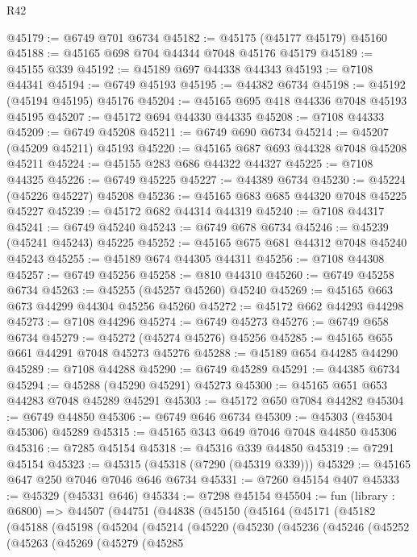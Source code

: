 \begin{lexlean}{R42}
\begin{coremodule}
{@45179 := @6749 @701 @6734
@45182 := @45175 (@45177 @45179) @45160
@45188 := @45165 @698 @704 @44344 @7048 @45176 @45179
@45189 := @45155 @339
@45192 := @45189 @697 @44338 @44343
@45193 := @7108 @44341
@45194 := @6749 @45193
@45195 := @44382 @6734
@45198 := @45192 (@45194 @45195) @45176
@45204 := @45165 @695 @418 @44336 @7048 @45193 @45195
@45207 := @45172 @694 @44330 @44335
@45208 := @7108 @44333
@45209 := @6749 @45208
@45211 := @6749 @690 @6734
@45214 := @45207 (@45209 @45211) @45193
@45220 := @45165 @687 @693 @44328 @7048 @45208 @45211
@45224 := @45155 @283 @686 @44322 @44327
@45225 := @7108 @44325
@45226 := @6749 @45225
@45227 := @44389 @6734
@45230 := @45224 (@45226 @45227) @45208
@45236 := @45165 @683 @685 @44320 @7048 @45225 @45227
@45239 := @45172 @682 @44314 @44319
@45240 := @7108 @44317
@45241 := @6749 @45240
@45243 := @6749 @678 @6734
@45246 := @45239 (@45241 @45243) @45225
@45252 := @45165 @675 @681 @44312 @7048 @45240 @45243
@45255 := @45189 @674 @44305 @44311
@45256 := @7108 @44308
@45257 := @6749 @45256
@45258 := @810 @44310
@45260 := @6749 @45258 @6734
@45263 := @45255 (@45257 @45260) @45240
@45269 := @45165 @663 @673 @44299 @44304 @45256 @45260
@45272 := @45172 @662 @44293 @44298
@45273 := @7108 @44296
@45274 := @6749 @45273
@45276 := @6749 @658 @6734
@45279 := @45272 (@45274 @45276) @45256
@45285 := @45165 @655 @661 @44291 @7048 @45273 @45276
@45288 := @45189 @654 @44285 @44290
@45289 := @7108 @44288
@45290 := @6749 @45289
@45291 := @44385 @6734
@45294 := @45288 (@45290 @45291) @45273
@45300 := @45165 @651 @653 @44283 @7048 @45289 @45291
@45303 := @45172 @650 @7084 @44282
@45304 := @6749 @44850
@45306 := @6749 @646 @6734
@45309 := @45303 (@45304 @45306) @45289
@45315 := @45165 @343 @649 @7046 @7048 @44850 @45306
@45316 := @7285 @45154
@45318 := @45316 @339 @44850
@45319 := @7291 @45154
@45323 := @45315 (@45318 (@7290 (@45319 @339)))
@45329 := @45165 @647 @250 @7046 @7046 @646 @6734
@45331 := @7260 @45154 @407
@45333 := @45329 (@45331 @646)
@45334 := @7298 @45154
@45504 := fun (library : @6800) =>
  @44507
    (@44751
      (@44838
        (@45150
          (@45164
            (@45171
              (@45182
                (@45188
                  (@45198
                    (@45204
                      (@45214
                        (@45220
                          (@45230
                            (@45236
                              (@45246
                                (@45252
                                  (@45263
                                    (@45269
                                      (@45279
                                        (@45285
}
\end{coremodule}
\end{lexlean}
